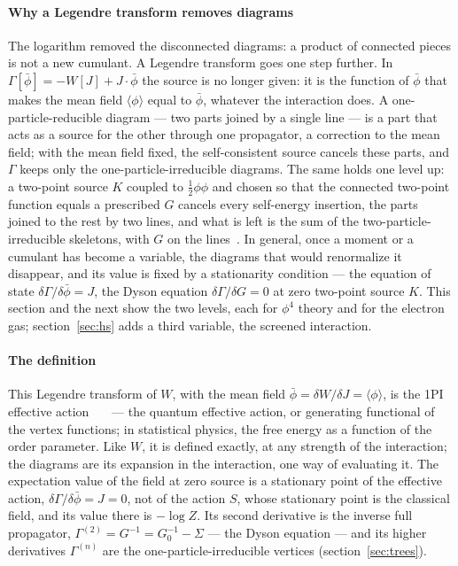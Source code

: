 \documentclass[11pt,a4paper]{article}
\begin{document}
\paragraph{Why a Legendre transform removes diagrams} The logarithm removed the disconnected diagrams: a product of
connected pieces is not a new cumulant. A Legendre transform goes one step further. In $\Gamma[\bar\phi]=-W[J]+J\cdot\bar\phi$ the
source is no longer given: it is the function of $\bar\phi$ that makes the mean field $\langle\phi\rangle$ equal to $\bar\phi$,
whatever the interaction does. A one-particle-reducible diagram --- two parts joined by a single line --- is a part that
acts as a source for the other through one propagator, a correction to the mean field; with the mean field fixed, the
self-consistent source cancels these parts, and $\Gamma$ keeps only the one-particle-irreducible diagrams. The same holds one
level up: a two-point source $K$ coupled to $\frac12\phi\phi$ and chosen so that the connected two-point function equals a prescribed
$G$ cancels every self-energy insertion, the parts joined to the rest by two lines, and what is left is the sum of the
two-particle-irreducible skeletons, with $G$ on the lines~\cite{DeDominicisMartin1964a,DeDominicisMartin1964b,CornwallJackiwTomboulis1974,Vasilev1998}.
In general, once a moment or a cumulant has become a variable, the diagrams that would renormalize it disappear, and its
value is fixed by a stationarity condition --- the equation of state $\delta\Gamma/\delta\bar\phi=J$, the Dyson equation
$\delta\Gamma/\delta G=0$ at zero two-point source $K$. This section and the next show the two levels, each for $\phi^4$ theory
and for the electron gas; section~\ref{sec:hs} adds a third variable, the screened interaction.

\paragraph{The definition} This Legendre transform of $W$, with the mean field $\bar\phi=\delta W/\delta J=\langle\phi\rangle$, is the 1PI
effective action~\cite{JonaLasinio1964,DeDominicisMartin1964a}~\cite[sections~7.5 and 7.8]{ZinnJustin2002}~\cite[section~16.1]{Weinberg1996} --- the quantum
effective action, or generating functional of the vertex functions; in statistical physics, the free energy as a
function of the order parameter. Like $W$, it is defined exactly, at any strength of the interaction; the diagrams are its
expansion in the interaction, one way of evaluating it. The expectation value of the field at zero source is a stationary
point of the effective action, $\delta\Gamma/\delta\bar\phi=J=0$, not of the action $S$, whose stationary point is the
classical field, and its value there is $-\log Z$. Its second derivative is the inverse full propagator,
$\Gamma^{(2)}=G^{-1}=G_0^{-1}-\Sigma$ --- the Dyson equation --- and its higher derivatives $\Gamma^{(n)}$ are the
one-particle-irreducible vertices (section~\ref{sec:trees}).
\end{document}
